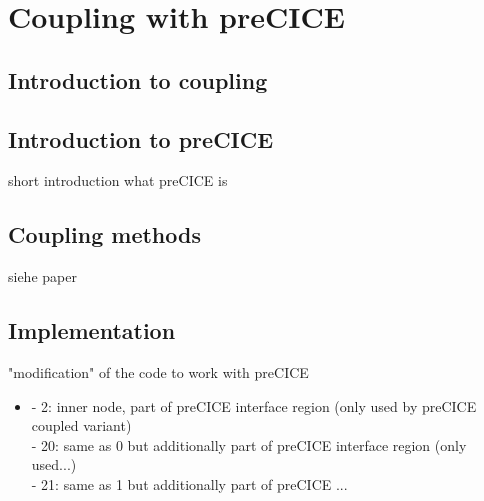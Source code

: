 \section{Coupling with preCICE} %



 \subsection{Introduction to coupling}




 \subsection{Introduction to preCICE}
 short introduction what preCICE is



 \subsection{Coupling methods}
  siehe paper



 \subsection{Implementation}
 "modification" of the code to work with preCICE
 \begin{itemize}
 	\item - 2: inner node, part of preCICE interface region (only used by preCICE coupled variant)\\
 	- 20: same as 0 but additionally part of preCICE interface region (only used...)\\
 	- 21: same as 1 but additionally part of preCICE ...
 \end{itemize}
\newpage